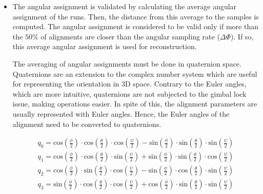 \documentclass[../main.tex]{subfiles}
\begin{document}
\begin{itemize}
    \item The angular assignment is validated by calculating the average angular assignment of the runs. Then, the distance from this average to the samples is computed. The angular assignment is considered to be valid only if more than the $50 \si{\percent}$ of alignments are closer than the angular sampling rate ($\Delta\Phi$). If so, this average angular assignment is used for reconstruction.

    The averaging of angular assignments must be done in quaternion space. Quaternions are an extension to the complex number system which are useful for representing the orientation in 3D space. Contrary to the Euler angles, which are more intuitive, quaternions are not subjected to the gimbal lock issue, making operations easier. In spite of this, the alignment parameters are usually represented with Euler angles. Hence, the Euler angles of the alignment need to be converted to quaternions.

    \begin{equation}
    \begin{split}
    q_0 = 
    \text{cos}\left( \frac{\phi}{2} \right) \cdot \text{cos}\left( \frac{\theta}{2} \right)  \cdot \text{cos}\left( \frac{\psi}{2} \right) -
    \text{sin}\left( \frac{\phi}{2} \right) \cdot \text{sin}\left( \frac{\theta}{2} \right)  \cdot \text{sin}\left( \frac{\psi}{2} \right) \\
    q_1 = 
    \text{cos}\left( \frac{\phi}{2} \right) \cdot \text{cos}\left( \frac{\theta}{2} \right)  \cdot \text{sin}\left( \frac{\psi}{2} \right) +
    \text{sin}\left( \frac{\phi}{2} \right) \cdot \text{sin}\left( \frac{\theta}{2} \right)  \cdot \text{cos}\left( \frac{\psi}{2} \right) \\
    q_2 = 
    \text{cos}\left( \frac{\phi}{2} \right) \cdot \text{sin}\left( \frac{\theta}{2} \right)  \cdot \text{cos}\left( \frac{\psi}{2} \right) -
    \text{sin}\left( \frac{\phi}{2} \right) \cdot \text{cos}\left( \frac{\theta}{2} \right)  \cdot \text{sin}\left( \frac{\psi}{2} \right) \\
    q_3 = 
    \text{sin}\left( \frac{\phi}{2} \right) \cdot \text{cos}\left( \frac{\theta}{2} \right)  \cdot \text{cos}\left( \frac{\psi}{2} \right) +
    \text{cos}\left( \frac{\phi}{2} \right) \cdot \text{sin}\left( \frac{\theta}{2} \right)  \cdot \text{sin}\left( \frac{\psi}{2} \right)
    \end{split}
    \end{equation}


\end{itemize}
\end{document}
